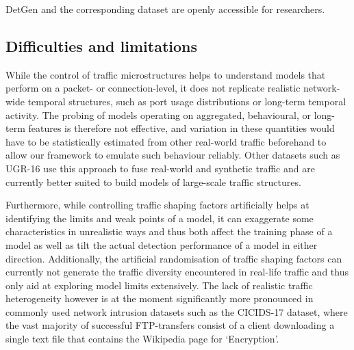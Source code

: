 \documentclass[runningheads]{llncs}
\begin{document}
DetGen and the corresponding dataset are openly accessible for researchers.




\subsection{Difficulties and limitations}

While the control of traffic microstructures helps to understand models that perform on a packet- or connection-level, it does not replicate realistic network-wide temporal structures, such as port usage distributions or long-term temporal activity. The probing of models operating on aggregated, behavioural, or long-term features is therefore not effective, and variation in these quantities would have to be statistically estimated from other real-world traffic beforehand to allow our framework to emulate such behaviour reliably. Other datasets such as UGR-16 \cite{macia2018ugr} use this approach to fuse real-world and synthetic traffic and are currently better suited to build models of large-scale traffic structures.

Furthermore, while controlling traffic shaping factors artificially helps at identifying the limits and weak points of a model, it can exaggerate some characteristics in unrealistic ways and thus both affect the training phase of a model as well as tilt the actual detection performance of a model in either direction. Additionally, the artificial randomisation of traffic shaping factors can currently not generate the traffic diversity encountered in real-life traffic and thus only aid at exploring model limits extensively. The lack of realistic traffic heterogeneity however is at the moment significantly more pronounced in commonly used network intrusion datasets such as the CICIDS-17 dataset, where the vast majority of successful FTP-transfers consist of a client downloading a single text file that contains the Wikipedia page for ‘Encryption’.
\end{document}
